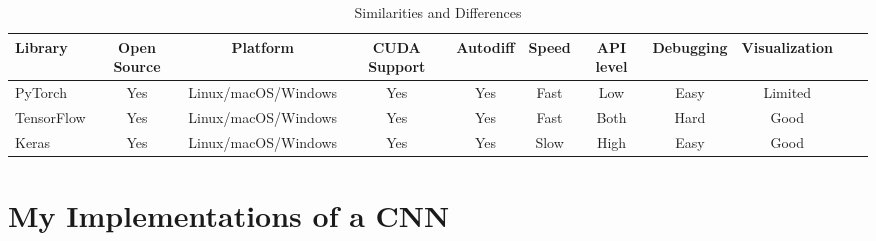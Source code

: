 \documentclass[conference]{IEEEtran}
\begin{document}
\begin{table*}
\caption{Similarities and Differences}
\label{my-label}
\begin{tabularx}{\textwidth}{@{} l *{10}{C}}
\toprule
Library  
& Open Source & Platform & CUDA Support & Autodiff & Speed & API level & Debugging & Visualization\\ 
\midrule
PyTorch & Yes & Linux/macOS/Windows & Yes & Yes & Fast & Low & Easy & Limited\\ 
\addlinespace
TensorFlow & Yes & Linux/macOS/Windows & Yes & Yes & Fast & Both & Hard & Good \\ 
\addlinespace
Keras & Yes & Linux/macOS/Windows & Yes & Yes & Slow & High & Easy & Good \\ 
\bottomrule
\end{tabularx}
\end{table*}

\section{My Implementations of a CNN}
\end{document}
